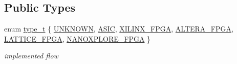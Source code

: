 \subsection*{Public Types}
\begin{DoxyCompactItemize}
\item 
enum \hyperlink{classBackendFlow_ac342772f1d3890eb1aad9a8de911da08}{type\+\_\+t} \{ \newline
\hyperlink{classBackendFlow_ac342772f1d3890eb1aad9a8de911da08afd038fecd343a55b1a711d7108da1f17}{U\+N\+K\+N\+O\+WN}, 
\hyperlink{classBackendFlow_ac342772f1d3890eb1aad9a8de911da08a5affe965824963567207e312821bad30}{A\+S\+IC}, 
\hyperlink{classBackendFlow_ac342772f1d3890eb1aad9a8de911da08a7dfd6cd7393491e138a982d565037390}{X\+I\+L\+I\+N\+X\+\_\+\+F\+P\+GA}, 
\hyperlink{classBackendFlow_ac342772f1d3890eb1aad9a8de911da08af9fe1ee5d7d03e5d2ad6df92cd801ad6}{A\+L\+T\+E\+R\+A\+\_\+\+F\+P\+GA}, 
\newline
\hyperlink{classBackendFlow_ac342772f1d3890eb1aad9a8de911da08a438290b2a7dd62e3b8ef3f987be2bead}{L\+A\+T\+T\+I\+C\+E\+\_\+\+F\+P\+GA}, 
\hyperlink{classBackendFlow_ac342772f1d3890eb1aad9a8de911da08aaab4c8011fd46741e481ab9291fd245c}{N\+A\+N\+O\+X\+P\+L\+O\+R\+E\+\_\+\+F\+P\+GA}
 \}\begin{DoxyCompactList}\small\item\em implemented flow \end{DoxyCompactList}
\end{DoxyCompactItemize}

